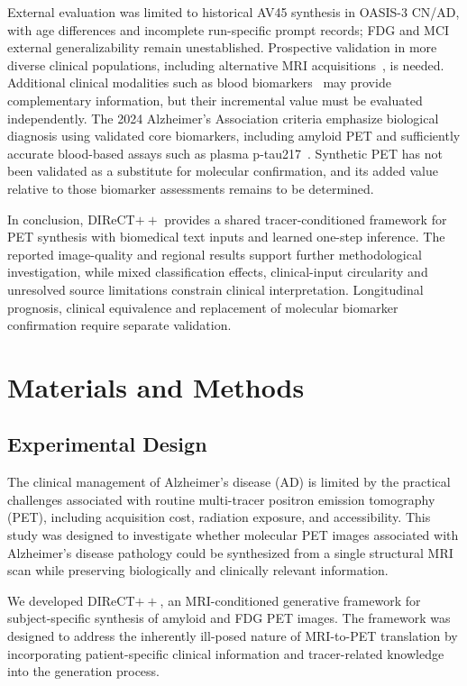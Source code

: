 \documentclass{article}
\begin{document}
External evaluation was limited to historical AV45 synthesis in OASIS-3 CN/AD, with age differences and incomplete run-specific prompt records; FDG and MCI external generalizability remain unestablished. Prospective validation in more diverse clinical populations, including alternative MRI acquisitions~\cite{sorby2024portable}, is needed. Additional clinical modalities such as blood biomarkers~\cite{hansson2023blood} may provide complementary information, but their incremental value must be evaluated independently. The 2024 Alzheimer's Association criteria emphasize biological diagnosis using validated core biomarkers, including amyloid PET and sufficiently accurate blood-based assays such as plasma p-tau217~\cite{jack2024revised}. Synthetic PET has not been validated as a substitute for molecular confirmation, and its added value relative to those biomarker assessments remains to be determined.

In conclusion, DIReCT$++$ provides a shared tracer-conditioned framework for PET synthesis with biomedical text inputs and learned one-step inference. The reported image-quality and regional results support further methodological investigation, while mixed classification effects, clinical-input circularity and unresolved source limitations constrain clinical interpretation. Longitudinal prognosis, clinical equivalence and replacement of molecular biomarker confirmation require separate validation.



\section{Materials and Methods}
\subsection{Experimental Design}

The clinical management of Alzheimer's disease (AD) is limited by the
practical challenges associated with routine multi-tracer positron emission
tomography (PET), including acquisition cost, radiation exposure, and
accessibility. This study was designed to investigate whether molecular PET
images associated with Alzheimer's disease pathology could be synthesized
from a single structural MRI scan while preserving biologically and
clinically relevant information.

We developed DIReCT$++$, an MRI-conditioned generative framework for
subject-specific synthesis of amyloid and FDG PET images. The framework was
designed to address the inherently ill-posed nature of MRI-to-PET translation
by incorporating patient-specific clinical information and tracer-related
knowledge into the generation process.
\end{document}
